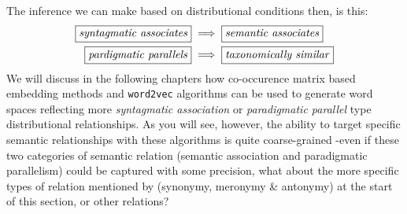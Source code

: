 The inference we can make based on distributional conditions then, is this:
\begin{align}
  \text{\fbox{\emph{syntagmatic associates}}}&\implies\text{\fbox{\emph{\vphantom{g}semantic associates}}}\\
  \text{\fbox{\emph{pardigmatic parallels}}}&\implies\text{\fbox{\emph{taxonomically similar}}}
\end{align}
\noindent
We will discuss in the following chapters how co-occurence matrix based embedding methods and \texttt{word2vec} algorithms can be used to generate word spaces reflecting more \emph{syntagmatic association} or \emph{paradigmatic parallel} type distributional relationships. As you will see, however, the ability to target specific semantic relationships with these algorithms is quite coarse-grained -even if these two categories of semantic relation (semantic association and paradigmatic parallelism) could be captured with some precision, what about the more specific types of relation mentioned by \citeauthor{turney10-from-frequen-to-meanin} (synonymy, meronymy \& antonymy) at the start of this section, or other relations?

